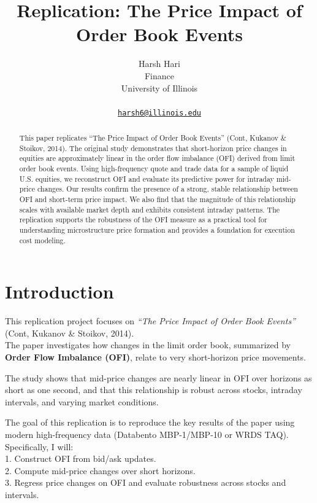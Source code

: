 \documentclass{article}
\title{Replication: The Price Impact of Order Book Events}
\author{
    Harsh Hari
   \\
    Finance \\
    University of Illinois \\
   \\
  \texttt{\href{mailto:harsh6@illinois.edu}{\nolinkurl{harsh6@illinois.edu}}} \\
  }
\begin{document}
\maketitle


\begin{abstract}
This paper replicates ``The Price Impact of Order Book Events'' (Cont,
Kukanov \& Stoikov, 2014). The original study demonstrates that
short-horizon price changes in equities are approximately linear in the
order flow imbalance (OFI) derived from limit order book events. Using
high-frequency quote and trade data for a sample of liquid U.S.
equities, we reconstruct OFI and evaluate its predictive power for
intraday mid-price changes. Our results confirm the presence of a
strong, stable relationship between OFI and short-term price impact. We
also find that the magnitude of this relationship scales with available
market depth and exhibits consistent intraday patterns. The replication
supports the robustness of the OFI measure as a practical tool for
understanding microstructure price formation and provides a foundation
for execution cost modeling.
\end{abstract}


\section{Introduction}\label{introduction}

This replication project focuses on \emph{``The Price Impact of Order
Book Events''} (Cont, Kukanov \& Stoikov, 2014).\\
The paper investigates how changes in the limit order book, summarized
by \textbf{Order Flow Imbalance (OFI)}, relate to very short-horizon
price movements.

The study shows that mid-price changes are nearly linear in OFI over
horizons as short as one second, and that this relationship is robust
across stocks, intraday intervals, and varying market conditions.

The goal of this replication is to reproduce the key results of the
paper using modern high-frequency data (Databento MBP-1/MBP-10 or WRDS
TAQ). Specifically, I will:\\
1. Construct OFI from bid/ask updates.\\
2. Compute mid-price changes over short horizons.\\
3. Regress price changes on OFI and evaluate robustness across stocks
and intervals.
\end{document}
